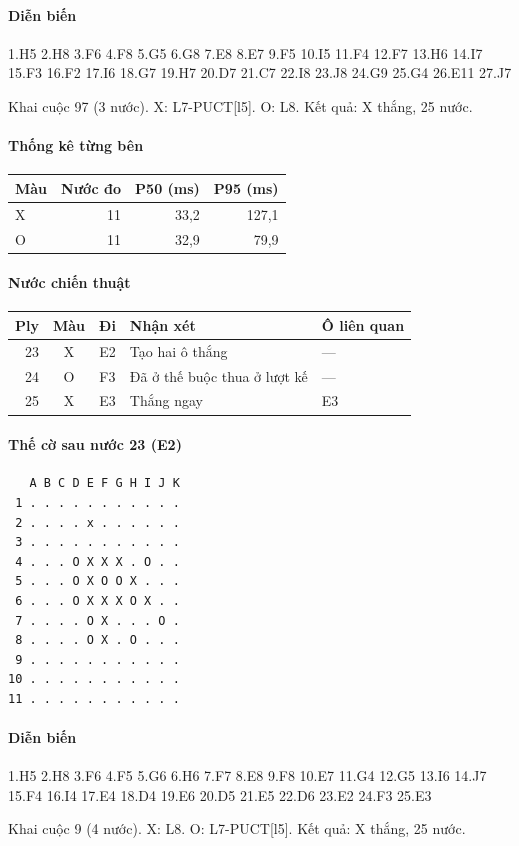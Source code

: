 \paragraph{Diễn biến}
{\footnotesize 1.H5 2.H8 3.F6 4.F8 5.G5 6.G8 7.E8 8.E7 9.F5 10.I5 11.F4 12.F7 13.H6 14.I7 15.F3 16.F2 17.I6 18.G7 19.H7 20.D7 21.C7 22.I8 23.J8 24.G9 25.G4 26.E11 27.J7\par}
Khai cuộc 97 (3 nước). X: L7-PUCT[l5]. O: L8. Kết quả: X thắng, 25 nước.
\paragraph{Thống kê từng bên}
\begin{center}\small
\begin{tabular}{@{}lrrr@{}}
\toprule
Màu & Nước đo & P50 (ms) & P95 (ms) \\
\midrule
X & 11 & 33,2 & 127,1 \\
O & 11 & 32,9 & 79,9 \\
\bottomrule
\end{tabular}
\end{center}
\paragraph{Nước chiến thuật}
\begin{center}\small
\begin{tabular}{@{}rccll@{}}
\toprule
Ply & Màu & Đi & Nhận xét & Ô liên quan \\
\midrule
23 & X & E2 & Tạo hai ô thắng & — \\
24 & O & F3 & Đã ở thế buộc thua ở lượt kế & — \\
25 & X & E3 & Thắng ngay & E3 \\
\bottomrule
\end{tabular}
\end{center}
\paragraph{Thế cờ sau nước 23 (E2)}
\begin{verbatim}
   A B C D E F G H I J K
 1 . . . . . . . . . . .
 2 . . . . x . . . . . .
 3 . . . . . . . . . . .
 4 . . . O X X X . O . .
 5 . . . O X O O X . . .
 6 . . . O X X X O X . .
 7 . . . . O X . . . O .
 8 . . . . O X . O . . .
 9 . . . . . . . . . . .
10 . . . . . . . . . . .
11 . . . . . . . . . . .
\end{verbatim}
\paragraph{Diễn biến}
{\footnotesize 1.H5 2.H8 3.F6 4.F5 5.G6 6.H6 7.F7 8.E8 9.F8 10.E7 11.G4 12.G5 13.I6 14.J7 15.F4 16.I4 17.E4 18.D4 19.E6 20.D5 21.E5 22.D6 23.E2 24.F3 25.E3\par}
Khai cuộc 9 (4 nước). X: L8. O: L7-PUCT[l5]. Kết quả: X thắng, 25 nước.
